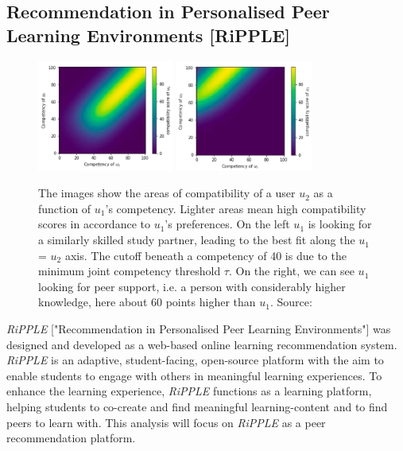 \documentclass[conference]{IEEEtran}
\begin{document}
\subsection{Recommendation in Personalised Peer Learning Environments [RiPPLE]} \label{paper:RiPPLE}
\begin{figure}[!t]
	\centering
	\includegraphics[width=0.4\textwidth]{g/SeekingPartnerCompatibility.PNG}
	\includegraphics[width=0.4\textwidth]{g/SeekingSupportCompatibility.PNG}
	\caption{The images show the areas of compatibility of a user \(u_2\) as a function of \(u_1\)'s competency. Lighter areas mean high compatibility scores in accordance to \(u_1\)'s preferences. On the left \(u_1\) is looking for a similarly skilled study partner, leading to the best fit along the \(u_1\) = \(u_2\) axis. The cutoff beneath a competency of 40 is due to the minimum joint competency threshold \(\tau\). On the right, we can see \(u_1\) looking for peer	 support, i.e. a person with considerably higher knowledge, here about 60 points higher than \(u_1\). Source: \cite{potts2018reciprocal}}
	\label{f:Seeking}
\end{figure}
\textit{RiPPLE} ["Recommendation in Personalised Peer Learning Environments"] was designed and developed as a web-based online learning recommendation system. \textit{RiPPLE} is an adaptive, student-facing, open-source platform with the aim to enable students to engage with others in meaningful learning experiences. To enhance the learning experience, \textit{RiPPLE} functions as a learning platform, helping students to co-create and find meaningful learning-content and to find peers to learn with. This analysis will focus on \textit{RiPPLE} as a peer recommendation platform.\\
\end{document}
